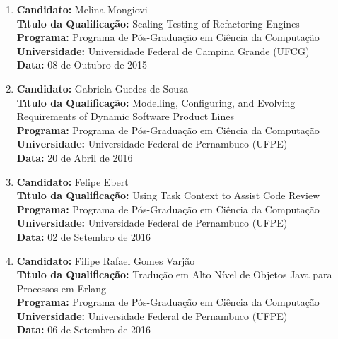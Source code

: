 \documentclass[a4paper,oneside,10pt]{article}
\begin{document}
\begin{enumerate}
\renewcommand{\labelenumi}{{\large\bfseries\arabic{enumi}.}}
\vspace{0.3cm}

\item       \textbf{Candidato:} Melina Mongiovi \mbox{} \\
            \textbf{T\'{\i}tulo da Qualifica\c{c}\~{a}o:} Scaling Testing of Refactoring Engines\\
            \textbf{Programa:} Programa de Pós-Graduação em Ciência da Computação\\
            \textbf{Universidade:} Universidade Federal de Campina Grande (UFCG)\\
            \textbf{Data:} 08 de Outubro de 2015

\item       \textbf{Candidato:} Gabriela Guedes de Souza \mbox{} \\
            \textbf{T\'{\i}tulo da Qualifica\c{c}\~{a}o:} Modelling, Configuring, and Evolving Requirements of Dynamic Software Product Lines\\
            \textbf{Programa:} Programa de Pós-Graduação em Ciência da Computação\\
            \textbf{Universidade:} Universidade Federal de Pernambuco (UFPE)\\
            \textbf{Data:} 20 de Abril de 2016

\item       \textbf{Candidato:} Felipe Ebert \mbox{} \\
            \textbf{T\'{\i}tulo da Qualifica\c{c}\~{a}o:} Using Task Context to Assist Code Review\\
            \textbf{Programa:} Programa de Pós-Graduação em Ciência da Computação\\
            \textbf{Universidade:} Universidade Federal de Pernambuco (UFPE)\\
            \textbf{Data:} 02 de Setembro de 2016

\item       \textbf{Candidato:} Filipe Rafael Gomes Varjão \mbox{} \\
            \textbf{T\'{\i}tulo da Qualifica\c{c}\~{a}o:} Tradução em Alto Nível de Objetos Java para Processos em Erlang\\
            \textbf{Programa:} Programa de Pós-Graduação em Ciência da Computação\\
            \textbf{Universidade:} Universidade Federal de Pernambuco (UFPE)\\
            \textbf{Data:} 06 de Setembro de 2016

\end{enumerate}
\end{document}
